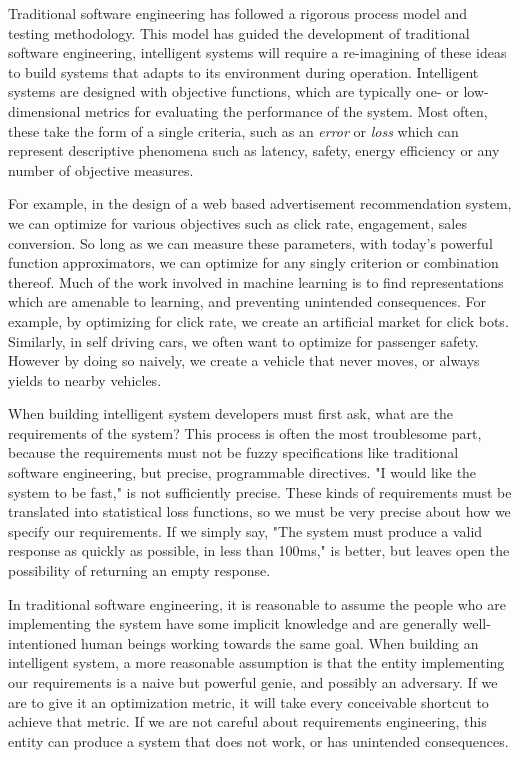 \documentclass[12pt,initial,twoside,maitrise]{dms}
\numberwithin{equation}{section}
\numberwithin{table}{chapter}
\numberwithin{figure}{chapter}
\begin{document}
Traditional software engineering has followed a rigorous process model and testing methodology. This model has guided the development of traditional software engineering, intelligent systems will require a re-imagining of these ideas to build systems that adapts to its environment during operation. Intelligent systems are designed with objective functions, which are typically one- or low-dimensional metrics for evaluating the performance of the system. Most often, these take the form of a single criteria, such as an \textit{error} or \textit{loss} which can represent descriptive phenomena such as latency, safety, energy efficiency or any number of objective measures.

For example, in the design of a web based advertisement recommendation system, we can optimize for various objectives such as click rate, engagement, sales conversion. So long as we can measure these parameters, with today's powerful function approximators, we can optimize for any singly criterion or combination thereof. Much of the work involved in machine learning is to find representations which are amenable to learning, and preventing unintended consequences. For example, by optimizing for click rate, we create an artificial market for click bots. Similarly, in self driving cars, we often want to optimize for passenger safety. However by doing so naively, we create a vehicle that never moves, or always yields to nearby vehicles.

When building intelligent system developers must first ask, what are the requirements of the system? This process is often the most troublesome part, because the requirements must not be fuzzy specifications like traditional software engineering, but precise, programmable directives. "I would like the system to be fast," is not sufficiently precise. These kinds of requirements must be translated into statistical loss functions, so we must be very precise about how we specify our requirements. If we simply say, "The system must produce a valid response as quickly as possible, in less than 100ms," is better, but leaves open the possibility of returning an empty response.

In traditional software engineering, it is reasonable to assume the people who are implementing the system have some implicit knowledge and are generally well-intentioned human beings working towards the same goal. When building an intelligent system, a more reasonable assumption is that the entity implementing our requirements is a naive but powerful genie, and possibly an adversary. If we are to give it an optimization metric, it will take every conceivable shortcut to achieve that metric. If we are not careful about requirements engineering, this entity can produce a system that does not work, or has unintended consequences.
\end{document}
